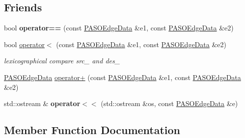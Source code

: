 \subsection*{Friends}
\begin{DoxyCompactItemize}
\item 
\hypertarget{class_p_a_s_o_edge_data_ac77d4d9a9f17d103bc5e26ec2ce14470}{}bool {\bfseries operator==} (const \hyperlink{class_p_a_s_o_edge_data}{P\+A\+S\+O\+Edge\+Data} \&e1, const \hyperlink{class_p_a_s_o_edge_data}{P\+A\+S\+O\+Edge\+Data} \&e2)\label{class_p_a_s_o_edge_data_ac77d4d9a9f17d103bc5e26ec2ce14470}

\item 
\hypertarget{class_p_a_s_o_edge_data_a22d47edff2cf9fcf3c566829afc7017f}{}bool \hyperlink{class_p_a_s_o_edge_data_a22d47edff2cf9fcf3c566829afc7017f}{operator$<$} (const \hyperlink{class_p_a_s_o_edge_data}{P\+A\+S\+O\+Edge\+Data} \&e1, const \hyperlink{class_p_a_s_o_edge_data}{P\+A\+S\+O\+Edge\+Data} \&e2)\label{class_p_a_s_o_edge_data_a22d47edff2cf9fcf3c566829afc7017f}

\begin{DoxyCompactList}\small\item\em lexicographical compare src\+\_\+ and des\+\_\+ \end{DoxyCompactList}\item 
\hyperlink{class_p_a_s_o_edge_data}{P\+A\+S\+O\+Edge\+Data} \hyperlink{class_p_a_s_o_edge_data_a2b37391eea5baa086db840f70de61a03}{operator+} (const \hyperlink{class_p_a_s_o_edge_data}{P\+A\+S\+O\+Edge\+Data} \&e1, const \hyperlink{class_p_a_s_o_edge_data}{P\+A\+S\+O\+Edge\+Data} \&e2)
\item 
\hypertarget{class_p_a_s_o_edge_data_a9edc45da304cc921387f24fcf56fc926}{}std\+::ostream \& {\bfseries operator$<$$<$} (std\+::ostream \&os, const \hyperlink{class_p_a_s_o_edge_data}{P\+A\+S\+O\+Edge\+Data} \&e)\label{class_p_a_s_o_edge_data_a9edc45da304cc921387f24fcf56fc926}

\end{DoxyCompactItemize}


\subsection{Member Function Documentation}
\hypertarget{class_p_a_s_o_edge_data_a1b40294da7d141e2f0be57ca01bc52a3}{}
